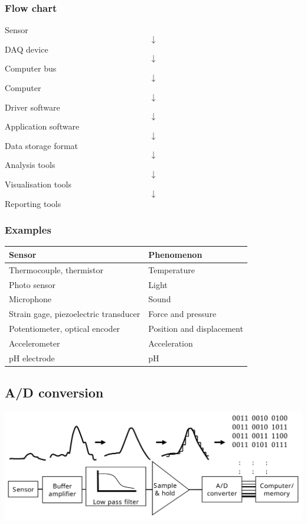 \documentclass[11pt]{article}
\begin{document}
 \newpage
\subsubsection{Flow chart}
\label{sec:orgc447008}
\begin{center}
Sensor
\[\downarrow\]
DAQ device
\[\downarrow\]
Computer bus
\[\downarrow\]
Computer
\[\downarrow\]
Driver software
\[\downarrow\]
Application software
\[\downarrow\]
Data storage format
\[\downarrow\]
Analysis tools
\[\downarrow\]
Visualisation tools
\[\downarrow\]
Reporting tools
\end{center}
\subsubsection{Examples}
\label{sec:org4fc65f0}
\begin{center}
\begin{tabular}{l|l}
Sensor & Phenomenon\\
\hline
Thermocouple, thermistor & Temperature\\
Photo sensor & Light\\
Microphone & Sound\\
Strain gage, piezoelectric transducer & Force and pressure\\
Potentiometer, optical encoder & Position and displacement\\
Accelerometer & Acceleration\\
pH electrode & pH\\
\end{tabular}
\end{center}
\subsection{A/D conversion}
\label{sec:orgd6e39a0}
\begin{center}
\includegraphics[width=.9\linewidth]{./images/a-d-conversion-flow-chart.png}
\end{center}
\end{document}
